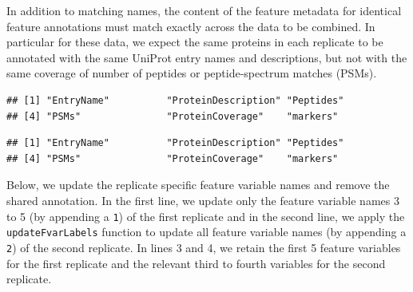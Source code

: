 In addition to matching names, the content of the feature metadata for
identical feature annotations must match exactly across the data to be
combined. In particular for these data, we expect the same proteins in
each replicate to be annotated with the same UniProt entry names and
descriptions, but not with the same coverage of number of peptides or
peptide-spectrum matches (PSMs).

\begin{knitrout}
\color{fgcolor}\begin{kframe}
\begin{alltt}
\end{alltt}
\begin{verbatim}
## [1] "EntryName"          "ProteinDescription" "Peptides"          
## [4] "PSMs"               "ProteinCoverage"    "markers"
\end{verbatim}
\begin{alltt}
\end{alltt}
\begin{verbatim}
## [1] "EntryName"          "ProteinDescription" "Peptides"          
## [4] "PSMs"               "ProteinCoverage"    "markers"
\end{verbatim}
\end{kframe}
\end{knitrout}

Below, we update the replicate specific feature variable names and
remove the shared annotation. In the first line, we update only the
feature variable names 3 to 5 (by appending a \texttt{1}) of the first
replicate and in the second line, we apply the
\texttt{updateFvarLabels} function to update all feature variable
names (by appending a \texttt{2}) of the second replicate. In lines 3
and 4, we retain the first 5 feature variables for the first replicate
and the relevant third to fourth variables for the second replicate.

